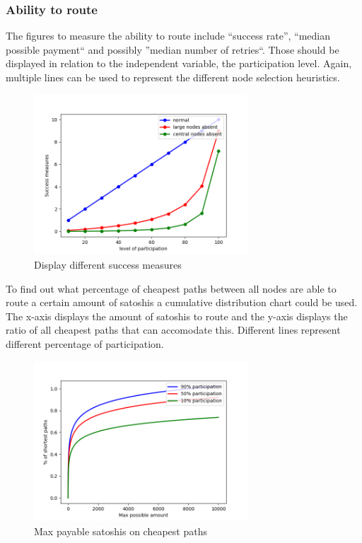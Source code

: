 \documentclass[final]{fhnwreport}       %
\begin{document}
\subsubsection{Ability to route}
The figures to measure the ability to route include ``success rate'', ``median possible payment`` and possibly ''median number of retries``. Those should be displayed in relation to the independent variable, the participation level. Again, multiple lines can be used to represent the different node selection heuristics.

\begin{figure}[h]
\centering
\includegraphics[width=8cm]{dummy_charts/success_measure.png}
\caption{Display different success measures}
\label{fig:Figure}
\end{figure}

To find out what percentage of cheapest paths between all nodes are able to route a certain amount of satoshis a cumulative distribution chart could be used. The x-axis displays the amount of satoshis to route and the y-axis displays the ratio of all cheapest paths that can accomodate this. Different lines represent different percentage of participation.

\begin{figure}[h]
\centering
\includegraphics[width=8cm]{dummy_charts/max_payable.png}
\caption{Max payable satoshis on cheapest paths}
\label{fig:Figure}
\end{figure}
\end{document}
